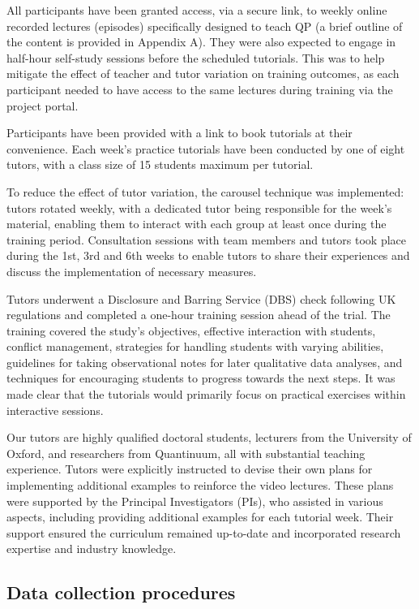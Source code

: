 All participants have been granted access, via a secure link, to weekly online recorded lectures (episodes) specifically designed to teach QP (a brief outline of the content is provided in Appendix A). They were also expected to engage in half-hour self-study sessions before the scheduled tutorials.
This was to help mitigate the effect of teacher and tutor variation on training outcomes, as each participant needed to have access to the same lectures during training via the project portal.

Participants have been provided with a link to book tutorials at their convenience. Each week's practice tutorials have been conducted by one of eight tutors, with a class size of 15 students maximum per tutorial.
 
To reduce the effect of tutor variation, the carousel technique was implemented: tutors rotated weekly, with a dedicated tutor being responsible for the week's material, enabling them to interact with each group at least once during the training period.
Consultation sessions with team members and tutors took place during the 1st, 3rd and 6th weeks to enable tutors to share their experiences and discuss the implementation of necessary measures.

Tutors underwent a Disclosure and Barring Service (DBS) check following UK regulations and completed a one-hour training session ahead of the trial. The training covered the study's objectives, effective interaction with students, conflict management, strategies for handling students with varying abilities, guidelines for taking observational notes for later qualitative data analyses, and techniques for encouraging students to progress towards the next steps.
It was made clear that the tutorials would primarily focus on practical exercises within interactive sessions.

Our tutors are highly qualified doctoral students, lecturers from the University of Oxford, and researchers from Quantinuum, all with substantial teaching experience.
Tutors were explicitly instructed to devise their own plans for implementing additional examples to reinforce the video lectures. These plans were supported by the Principal Investigators (PIs), who assisted in various aspects, including providing additional examples for each tutorial week. Their support ensured the curriculum remained up-to-date and incorporated research expertise and industry knowledge. 

\subsection{Data collection procedures}

